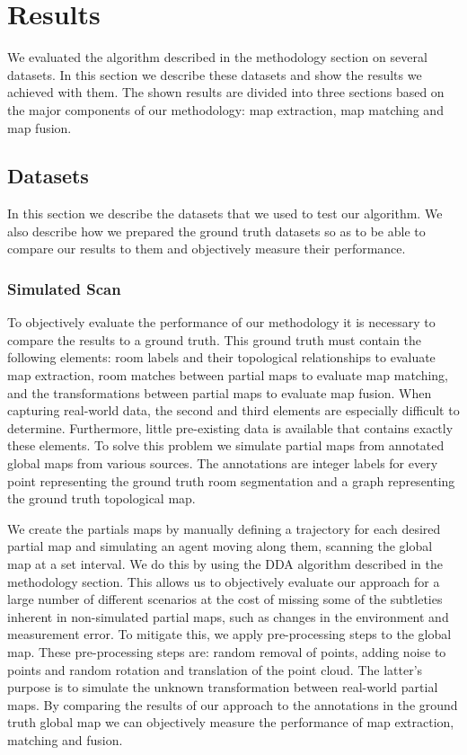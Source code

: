 \section{Results}
We evaluated the algorithm described in the methodology section on several datasets. In this section we describe these datasets and show the results we achieved with them. The shown results are divided into three sections based on the major components of our methodology: map extraction, map matching and map fusion. 

\subsection{Datasets}
In this section we describe the datasets that we used to test our algorithm. We also describe how we prepared the ground truth datasets so as to be able to compare our results to them and objectively measure their performance. 

\subsubsection{Simulated Scan}
To objectively evaluate the performance of our methodology it is necessary to compare the results to a ground truth. This ground truth must contain the following elements: room labels and their topological relationships to evaluate map extraction, room matches between partial maps to evaluate map matching, and the transformations between partial maps to evaluate map fusion. When capturing real-world data, the second and third elements are especially difficult to determine. Furthermore, little pre-existing data is available that contains exactly these elements. To solve this problem we simulate partial maps from annotated global maps from various sources. The annotations are integer labels for every point representing the ground truth room segmentation and a graph representing the ground truth topological map. 

We create the partials maps by manually defining a trajectory for each desired partial map and simulating an agent moving along them, scanning the global map at a set interval. We do this by using the DDA algorithm described in the methodology section. This allows us to objectively evaluate our approach for a large number of different scenarios at the cost of missing some of the subtleties inherent in non-simulated partial maps, such as changes in the environment and measurement error. To mitigate this, we apply pre-processing steps to the global map. These pre-processing steps are: random removal of points, adding noise to points and random rotation and translation of the point cloud. The latter's purpose is to simulate the unknown transformation between real-world partial maps. By comparing the results of our approach to the annotations in the ground truth global map we can objectively measure the performance of map extraction, matching and fusion. 

